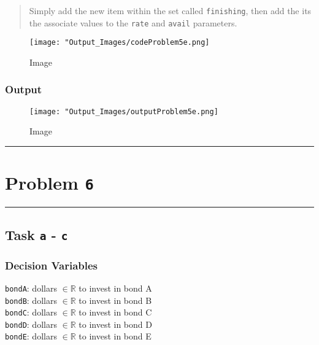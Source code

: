\documentclass[
  12pt,
]{article}
\begin{document}
\begin{quote}
Simply add the new item within the set called \texttt{finishing}, then
add the its the associate values to the \texttt{rate} and \texttt{avail}
parameters.
\end{quote}

\begin{figure}
\centering
\texttt{[image: "Output\_Images/codeProblem5e.png]}
\caption{Image}
\end{figure}

\hypertarget{output-8}{%
\subsubsection{Output}\label{output-8}}

\begin{figure}
\centering
\texttt{[image: "Output\_Images/outputProblem5e.png]}
\caption{Image}
\end{figure}

\begin{center}\rule{0.5\linewidth}{0.5pt}\end{center}

\hypertarget{problem-6}{%
\section{\texorpdfstring{Problem
\texttt{6}}{Problem 6}}\label{problem-6}}

\begin{center}\rule{0.5\linewidth}{0.5pt}\end{center}

\hypertarget{task-a---c}{%
\subsection{\texorpdfstring{Task \texttt{a} -
\texttt{c}}{Task a - c}}\label{task-a---c}}

\hypertarget{decision-variables-3}{%
\subsubsection{Decision Variables}\label{decision-variables-3}}

\texttt{bondA}: dollars \(\in \mathbb{R}\) to invest in bond A\\
\texttt{bondB}: dollars \(\in \mathbb{R}\) to invest in bond B\\
\texttt{bondC}: dollars \(\in \mathbb{R}\) to invest in bond C\\
\texttt{bondD}: dollars \(\in \mathbb{R}\) to invest in bond D\\
\texttt{bondE}: dollars \(\in \mathbb{R}\) to invest in bond E
\end{document}
